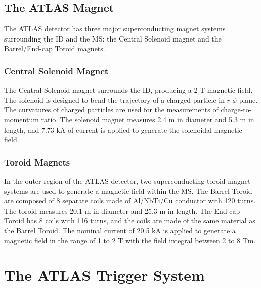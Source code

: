 \subsection{The ATLAS Magnet}
\label{sec:atlas:magnet}

The ATLAS detector has three major superconducting magnet systems surrounding the ID and the MS: the Central Solenoid magnet and the Barrel/End-cap Toroid magnets.

\subsubsection{Central Solenoid Magnet}
\label{sec:atlas:solenoid}
The Central Solenoid magnet surrounds the ID, producing a 2 T magnetic field. The solenoid is designed to bend the trajectory of a charged particle in $r$-$\phi$ plane. The curvatures of charged particles are used for the measurements of charge-to-momentum ratio. The solenoid magnet measures 2.4 \si{\meter} in diameter and 5.3 \si{\meter} in length, and 7.73 \si{\kilo\ampere} of current is applied to generate the solenoidal magnetic field.


\subsubsection{Toroid Magnets}
\label{sec:atlas:toroid}

In the outer region of the ATLAS detector, two superconducting toroid magnet systems are used to generate a magnetic field within the MS. The Barrel Toroid are composed of 8 separate coils made of Al/NbTi/Cu conductor with 120 turns. The toroid measures 20.1 \si{\meter} in diameter and 25.3 \si{\meter} in length. The End-cap Toroid has 8 coils with 116 turns, and the coils are made of the same material as the Barrel Toroid. The nominal current of 20.5 \si{\kilo\ampere} is applied to generate a magnetic field in the range of 1 to 2 T with the field integral between 2 to 8 Tm.

\section{The ATLAS Trigger System}
\label{sec:atlas:daq}

